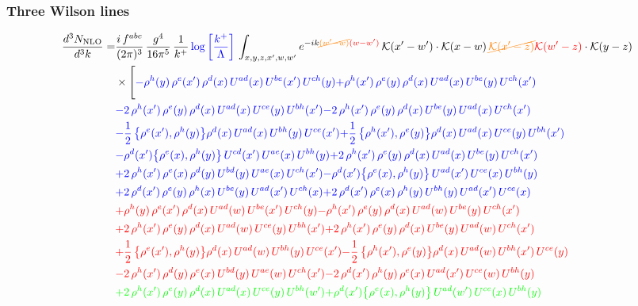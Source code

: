\documentclass[9pt]{article}
\numberwithin{equation}{section}
\begin{document}
\subsubsection{Three Wilson lines}
\begin{align}
    \frac{d^{3}N_{\rm NLO}}{d^{3}k}= & \frac{i\,f^{abc}}{(2\pi)^{3}}\,\frac{g^{4}}{16\pi^{5}}\,\frac{1}{k^{+}}\,{\color{blue}\log{\left[\frac{k^{+}}{\Lambda}\right]}}\,\int_{x,y,z,x',w,w'}e^{-ik{\color{orange}\cancel{(w'-w)}}{\color{red}(w-w')}}\,\mathcal{K}(x'-w')\cdot\mathcal{K}(x-w)\,{\color{orange}\cancel{\mathcal{K}(x'-z)}}{\color{red}\mathcal{K}(w'-z)}\cdot\mathcal{K}(y-z)\notag \\ & \times\Bigg[{\color{blue}-\rho^{h}(y)\,\rho^{e}(x')\,\rho^{d}(x)\,U^{ad}(x)\,U^{be}(x')\,U^{ch}(y)}{\color{blue}+\rho^{h}(x')\,\rho^{e}(y)\,\rho^{d}(x)\,U^{ad}(x)\,U^{be}(y)\,U^{ch}(x')}\notag \\ & {\color{blue}-2\,\rho^{h}(x')\,\rho^{e}(y)\,\rho^{d}(x)\,U^{ad}(x)\,U^{ce}(y)\,U^{bh}(x')}{\color{blue}-2\,\rho^{h}(x')\,\rho^{e}(y)\,\rho^{d}(x)\,U^{be}(y)\,U^{ad}(x)\,U^{ch}(x')}\notag \\ & {\color{blue}-\frac{1}{2}\,\big\{\rho^{e}(x'),\rho^{h}(y)\big\}\rho^{d}(x)\,U^{ad}(x)\,U^{bh}(y)\,U^{ce}(x')}{\color{blue}+\frac{1}{2}\,\big\{\rho^{h}(x'),\rho^{e}(y)\big\}\rho^{d}(x)\,U^{ad}(x)\,U^{ce}(y)\,U^{bh}(x')}\notag \\ & {\color{blue}-\rho^{d}(x')\big\{\rho^{e}(x),\rho^{h}(y)\big\}\,U^{cd}(x')\,U^{ae}(x)\,U^{bh}(y)}{\color{blue}+2\,\rho^{h}(x')\,\rho^{e}(y)\,\rho^{d}(x)\,U^{ad}(x)\,U^{be}(y)\,U^{ch}(x')}\notag \\ & {\color{blue}+2\,\rho^{h}(x')\,\rho^{e}(x)\,\rho^{d}(y)\,U^{bd}(y)\,U^{ae}(x)\,U^{ch}(x')} {\color{blue}-\rho^{d}(x')\big\{\rho^{e}(x),\rho^{h}(y)\big\}\,U^{ad}(x')\,U^{ce}(x)\,U^{bh}(y)}\notag \\ & {\color{blue}+2\,\rho^{d}(x')\,\rho^{e}(y)\, \rho^{h}(x)\,U^{be}(y)\,U^{ad}(x')\,U^{ch}(x)}{\color{blue}+2\,\rho^{d}(x')\,\rho^{e}(x)\, \rho^{h}(y)\,U^{bh}(y)\,U^{ad}(x')\,U^{ce}(x)}\notag \\ & {\color{red}+\rho^{h}(y)\,\rho^{e}(x')\,\rho^{d}(x)\,U^{ad}(w)\,U^{be}(x')\,U^{ch}(y)}{\color{red}-\rho^{h}(x')\,\rho^{e}(y)\,\rho^{d}(x)\,U^{ad}(w)\,U^{be}(y)\,U^{ch}(x')}\notag \\ & {\color{red}+2\,\rho^{h}(x')\,\rho^{e}(y)\,\rho^{d}(x)\,U^{ad}(w)\,U^{ce}(y)\,U^{bh}(x')}{\color{red}+2\,\rho^{h}(x')\,\rho^{e}(y)\,\rho^{d}(x)\,U^{be}(y)\,U^{ad}(w)\,U^{ch}(x')}\notag \\ & {\color{red}+\frac{1}{2}\,\big\{\rho^{e}(x'),\rho^{h}(y)\big\}\rho^{d}(x)\,U^{ad}(w)\,U^{bh}(y)\,U^{ce}(x')}{\color{red}-\frac{1}{2}\,\big\{\rho^{h}(x'),\rho^{e}(y)\big\}\rho^{d}(x)\,U^{ad}(w)\,U^{bh}(x')\,U^{ce}(y)}\notag \\ & {\color{red}-2\,\rho^{h}(x')\,\rho^{d}(y)\,\rho^{e}(x)\,U^{bd}(y)\,U^{ae}(w)\,U^{ch}(x')}{\color{red}-2\,\rho^{d}(x')\,\rho^{h}(y)\, \rho^{e}(x)\,U^{ad}(x')\,U^{ce}(w)\,U^{bh}(y)}\notag \\ & {\color{green}+2\,\rho^{h}(x')\,\rho^{e}(y)\,\rho^{d}(x)\,U^{ad}(x)\,U^{ce}(y)\,U^{bh}(w')}{\color{green}+\rho^{d}(x')\big\{\rho^{e}(x),\rho^{h}(y)\big\}\,U^{ad}(w')\,U^{ce}(x)\,U^{bh}(y)}\notag \\ & 
\end{align}
\end{document}

